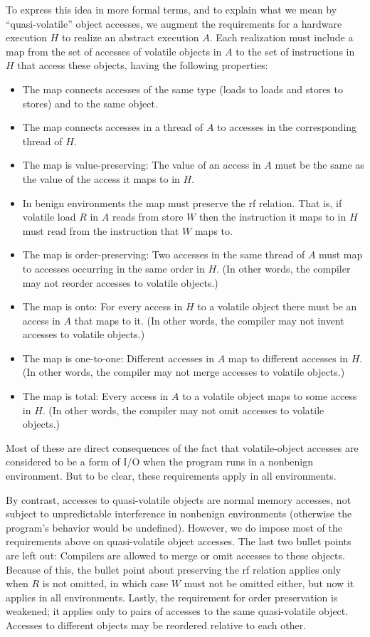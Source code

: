 To express this idea in more formal terms,
and to explain what we mean by ``quasi-volatile'' object accesses,
we augment the
requirements for a hardware execution $H$ to realize an abstract
execution $A$.
Each realization must include a map from the set of accesses of
volatile objects in $A$ to the set of instructions in $H$ that access
these objects, having the following properties:
\begin{itemize}
\item	The map connects accesses of the same type (loads to loads
	and stores to stores) and to the same object.
\item	The map connects accesses in a thread of $A$ to accesses in
	the corresponding thread of $H$.
\item	The map is value-preserving: The value of an access in $A$ must be
	the same as the value of the access it maps to in $H$.
\item	In benign environments the map must preserve the rf relation.
	That is, if volatile load $R$ in $A$ reads from store $W$
	then the instruction it maps to in $H$ must read from the
	instruction that $W$ maps to.
\item	The map is order-preserving: Two accesses in the same thread
	of $A$ must map to accesses occurring in the same order in $H$.
	(In other words, the compiler may not reorder accesses
	to volatile objects.)
\item	The map is onto: For every access in $H$ to a volatile object
	there must be an access in $A$ that maps to it.
	(In other words, the compiler may not invent accesses to
	volatile objects.)
\item	The map is one-to-one: Different accesses in $A$ map to
	different accesses in $H$.
	(In other words, the compiler may not merge accesses to
	volatile objects.)
\item	The map is total: Every access in $A$ to a volatile object
	maps to some access in $H$.
	(In other words, the compiler may not omit accesses to
	volatile objects.)
\end{itemize}
Most of these are direct consequences of the fact that volatile-object
accesses are considered to be a form of I/O when the program runs
in a nonbenign environment.
But to be clear, these requirements apply in all environments.

By contrast, accesses to quasi-volatile objects are normal memory
accesses, not subject to unpredictable interference in nonbenign
environments (otherwise the program's behavior would be undefined).
However, we do impose most of the requirements above on quasi-volatile
object accesses.
The last two bullet points are left out: Compilers are allowed to merge or
omit accesses to these objects.
Because of this, the bullet point about preserving the rf relation
applies only when $R$ is not omitted, in which case $W$ must not
be omitted either, but now it applies in all environments.
Lastly, the requirement for order preservation is weakened; it applies
only to pairs of accesses to the same quasi-volatile object.
Accesses to different objects may be reordered relative to each other.

